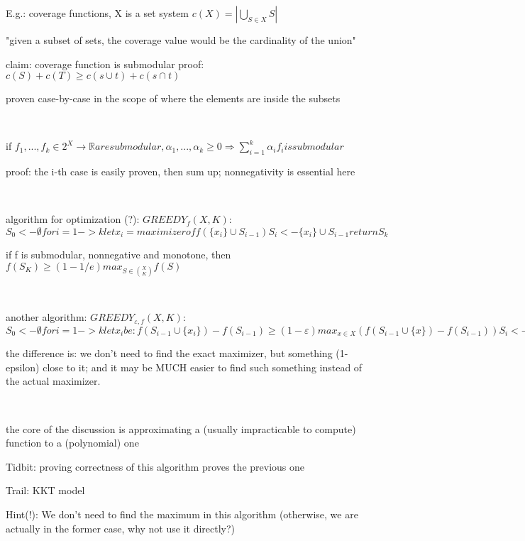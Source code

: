 \documentclass{report}
\begin{document}
	E.g.: coverage functions, X is a set system $c(X) = \left| \bigcup_{S \in X} S \right|$

	"given a subset of sets, the coverage value would be the cardinality of the union"
	
	claim: coverage function is submodular
	proof: $c(S)+c(T) \geq c(s\cup t) + c(s \cap t)$
	
	proven case-by-case in the scope of where the elements are inside the subsets
	
	\
	
	if $f_1, ..., f_k \in 2^X \to \mathbb{R} are submodular, \alpha_1, ..., \alpha_k \geq 0 \Rightarrow \sum_{i=1}^{k}\alpha_i f_i is submodular$
	
	proof: the i-th case is easily proven, then sum up; nonnegativity is essential here
	
	\
	
	algorithm for optimization (?): $GREEDY_f(X, K)$:
	$
	S_0 <- \emptyset
	for i=1 -> k
		let x_i = maximizer of f(\{x_i\} \cup S_{i-1})
		S_i <- \{x_i\} \cup S_{i-1}		
	return S_k
	$
	
	if f is submodular, nonnegative and monotone, then $\displaystyle f(S_K)\geq(1-1/e)max_{S \in \binom{X}{K}}f(S)$
	
	\
	
	another algorithm: $GREEDY_{\varepsilon, f}(X, K)$:
	$
	S_0 <- \emptyset
	for i=1 -> k
		let x_i be : f(S_{i-1} \cup \{x_i\}) - f(S_{i-1}) \geq (1-\varepsilon)max_{x \in X} (f(S_{i-1} \cup \{x\}) - f(S_{i-1})) %
		S_i <- \{x_i\} \cup S_{i-1}		
	return S_k
	$
	
	the difference is: we don't need to find the exact maximizer, but something (1-epsilon) close to it; and it may be MUCH easier to find such something instead of the actual maximizer.
	
	\
	
	the core of the discussion is approximating a (usually impracticable to compute) function to a (polynomial) one
	
	Tidbit: proving correctness of this algorithm proves the previous one
	
	Trail: KKT model
	
	Hint(!): We don't need to find the maximum in this algorithm (otherwise, we are actually in the former case, why not use it directly?)
	
	\
	
\end{document}
